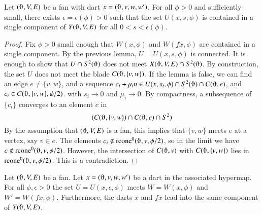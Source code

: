 \begin{lemma}
Let $(\orgn,V,E)$ be a fan with dart
$x=(\orgn,v,w,w')$.
For all $\phi > 0$ and sufficiently small, there exists
$\epsilon=\epsilon(\phi)>0$ such that
the set $U(x,s,\phi)$ is
contained in a single component of $Y(\orgn,V,E)$ for all 
$0 < s <\epsilon(\phi)$.
\end{lemma}

\begin{proof}  Fix $\phi>0$ small enough that $W(x,\phi)$
and $W(f x,\phi)$ are contained in a single component.
By the previous lemma, $U=U(x,s,\phi)$ 
is connected.  
It is enough to
show that $U\cap S^2(\orgn)$  does not meet $X(\orgn,V,E) \cap S^2(\orgn)$.
By construction, the set $U$ does not meet the blade
$C(\orgn,\{v,w\})$.  If the lemma is false, we can find an
edge $e\ne \{v,w\}$,
and
a sequence $c_i + \mu_i n \in U(x,s_i,\phi)\cap S^2(\orgn)
\cap C(\orgn,e)$, and $c_i\in C(\orgn,\{v,w\},\phi/2)$. 
with $s_i \to 0$ and $\mu_i\to 0$. 
By compactness, a subsequence
of  $\{c_i\}$ converges to an
element $c$ in 
  $$(C(\orgn,\{v,w\})\cap C(\orgn,e)\cap S^2)
  $$
By the assumption that  $(\orgn,V,E)$ is a fan, this
implies that $\{v,w\}$ meets $e$ at a vertex, say $v\in e$.
The elements $c_i\not\in \op{rcone}^0(\orgn,v,\phi/2)$, so
in the limit we have $c\not\in\op{rcone}^0(\orgn,v,\phi/2)$.
However, the intersection of $C(\orgn,v)$ with $C(\orgn,\{v,w\})$
lies in $\op{rcone}^0(\orgn,v,\phi/2)$.  This is a contradiction.
\end{proof}

\begin{lemma}
Let $(\orgn,V,E)$ be a fan.
Let $x=(\orgn,v,w,w')$ be a dart in the associated hypermap.
For all $\phi,\epsilon > 0$
the set $U=U(x,\epsilon,\phi)$ meets $W=W(x,\phi)$ and 
$W'=W(f x,\phi)$.
Furthermore, the darts $x$ and $f x$ lead into the same
component of $Y(\orgn,V,E)$.
\end{lemma}

